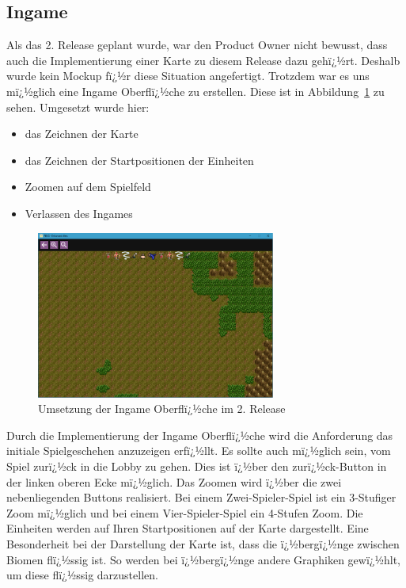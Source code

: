\documentclass[12pt, titlepage]{scrartcl}
\newcommand{\Abb}[1]{%
	Abbildung\ \ref{#1}%
}
\begin{document}
			\subsection{Ingame}
			Als das 2. Release geplant wurde, war den Product Owner nicht bewusst, dass auch die Implementierung einer Karte zu diesem Release dazu gehï¿½rt. Deshalb wurde kein Mockup fï¿½r diese Situation angefertigt. Trotzdem war es uns mï¿½glich eine Ingame Oberflï¿½che zu erstellen. Diese ist in \Abb{Ingame} zu sehen. Umgesetzt wurde hier:
			\begin{itemize}
				\item das Zeichnen der Karte
				\item das Zeichnen der Startpositionen der Einheiten
				\item Zoomen auf dem Spielfeld
				\item Verlassen des Ingames
			\end{itemize}
			\begin{figure}[H] 
				\centering
				\includegraphics[width=0.7\textwidth]{Ingame_final.PNG}
				\caption{Umsetzung der Ingame Oberflï¿½che im 2. Release}
				\label{Ingame}
			\end{figure}
			Durch die Implementierung der Ingame Oberflï¿½che wird die Anforderung das initiale Spielgeschehen anzuzeigen erfï¿½llt. Es sollte auch mï¿½glich sein, vom Spiel zurï¿½ck in die Lobby zu gehen. Dies ist ï¿½ber den zurï¿½ck-Button in der linken oberen Ecke mï¿½glich. Das Zoomen wird ï¿½ber die zwei nebenliegenden Buttons realisiert. Bei einem Zwei-Spieler-Spiel ist ein 3-Stufiger Zoom mï¿½glich und bei einem Vier-Spieler-Spiel ein 4-Stufen Zoom. Die Einheiten werden auf Ihren Startpositionen auf der Karte dargestellt. Eine Besonderheit bei der Darstellung der Karte ist, dass die ï¿½bergï¿½nge zwischen Biomen flï¿½ssig ist. So werden bei ï¿½bergï¿½nge andere Graphiken gewï¿½hlt, um diese flï¿½ssig darzustellen.
			
\end{document}

